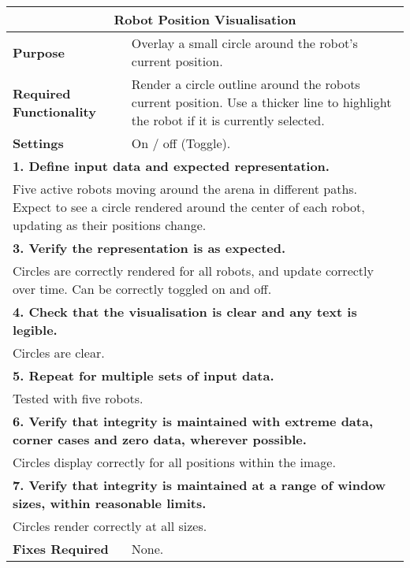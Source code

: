 \begin{longtable}{ l p{10cm} }
 \hline
 \multicolumn{2}{c}{\textbf{Robot Position Visualisation}}\\
 \hline
 \textbf{Purpose} & Overlay a small circle around the robot's current position.\\
 \textbf{Required Functionality} & Render a circle outline around the robots current position. Use a thicker line to highlight the robot if it is currently selected.\\
 \textbf{Settings} & On / off (Toggle).\\
 \hline
 \multicolumn{2}{p{14cm}}{\textbf{1. Define input data and expected representation.}}\\
 \multicolumn{2}{p{14cm}}{Five active robots moving around the arena in different paths. Expect to see a circle rendered around the center of each robot, updating as their positions change.}\\
 \hline
 \multicolumn{2}{p{14cm}}{\textbf{3. Verify the representation is as expected.}}\\
 \multicolumn{2}{p{14cm}}{Circles are correctly rendered for all robots, and update correctly over time. Can be correctly toggled on and off.}\\
 \hline
 \multicolumn{2}{p{14cm}}{\textbf{4. Check that the visualisation is clear and any text is legible.}}\\
 \multicolumn{2}{p{14cm}}{Circles are clear.}\\
 \hline
 \multicolumn{2}{p{14cm}}{\textbf{5. Repeat for multiple sets of input data.}}\\
 \multicolumn{2}{p{14cm}}{Tested with five robots.}\\
 \hline
 \multicolumn{2}{p{14cm}}{\textbf{6. Verify that integrity is maintained with extreme data, corner cases and zero data, wherever possible.}}\\
 \multicolumn{2}{p{14cm}}{Circles display correctly for all positions within the image.}\\
 \hline
 \multicolumn{2}{p{14cm}}{\textbf{7. Verify that integrity is maintained at a range of window sizes, within reasonable limits.}}\\
 \multicolumn{2}{p{14cm}}{Circles render correctly at all sizes.}\\
 \hline
 \textbf{Fixes Required} & None.\\
 \bottomrule
\end{longtable}
\clearpage

